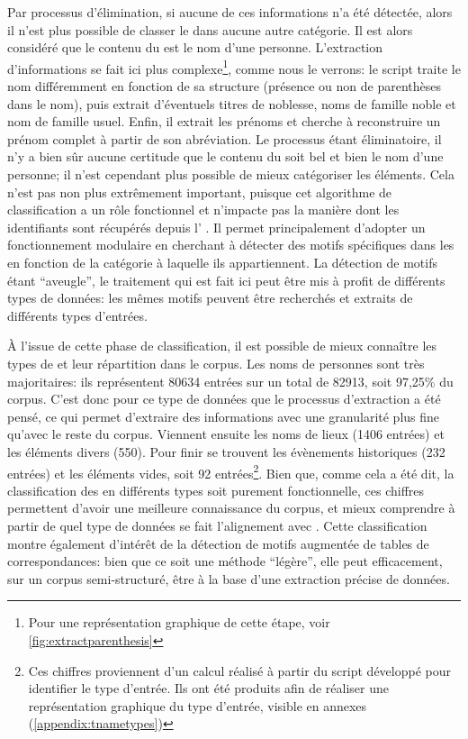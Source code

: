 Par processus d'élimination, si aucune de ces informations n'a été détectée, alors il n'est plus possible de classer le \tname{} dans aucune autre catégorie. Il est alors considéré que le contenu du \tname{} est le nom d'une personne. L'extraction d'informations se fait ici plus complexe\footnote{Pour une représentation graphique de cette étape, voir \ref{fig:extractparenthesis}}, comme nous le verrons: le script traite le nom différemment en fonction de sa structure (présence ou non de parenthèses dans le nom), puis extrait d'éventuels titres de noblesse, noms de famille noble et nom de famille usuel. Enfin, il extrait les prénoms et cherche à reconstruire un prénom complet à partir de son abréviation. Le processus étant éliminatoire, il n'y a bien sûr aucune certitude que le contenu du \tname{} soit bel et bien le nom d'une personne; il n'est cependant plus possible de mieux catégoriser les éléments. Cela n'est pas non plus extrêmement important, puisque cet algorithme de classification a un rôle fonctionnel et n'impacte pas la manière dont les identifiants sont récupérés depuis l'\api{} \wkd{}. Il permet principalement d'adopter un fonctionnement modulaire en cherchant à détecter des motifs spécifiques dans les \tname{} en fonction de la catégorie à laquelle ils appartiennent. La détection de motifs étant \enquote{aveugle}, le traitement qui est fait ici peut être mis à profit de différents types de données: les mêmes motifs peuvent être recherchés et extraits de différents types d'entrées.

À l'issue de cette phase de classification, il est possible de mieux connaître les types de \tname{} et leur répartition dans le corpus. Les noms de personnes sont très majoritaires: ils représentent 80634 entrées sur un total de 82913, soit 97,25\% du corpus. C'est donc pour ce type de données que le processus d'extraction a été pensé, ce qui permet d'extraire des informations avec une granularité plus fine qu'avec le reste du corpus. Viennent ensuite les noms de lieux (1406 entrées) et les éléments divers (550). Pour finir se trouvent les évènements historiques (232 entrées) et les éléments vides, soit 92 entrées\footnote{Ces chiffres proviennent d'un calcul réalisé à partir du script développé pour identifier le type d'entrée. Ils ont été produits afin de réaliser une représentation graphique du type d'entrée, visible en annexes (\ref{appendix:tnametypes})}. Bien que, comme cela a été dit, la classification des \tname{} en différents types soit purement fonctionnelle, ces chiffres permettent d'avoir une meilleure connaissance du corpus, et mieux comprendre à partir de quel type de données se fait l'alignement avec \wkd{}. Cette classification montre également d'intérêt de la détection de motifs augmentée de tables de correspondances: bien que ce soit une méthode \enquote{légère}, elle peut efficacement, sur un corpus semi-structuré, être à la base d'une extraction précise de données.


